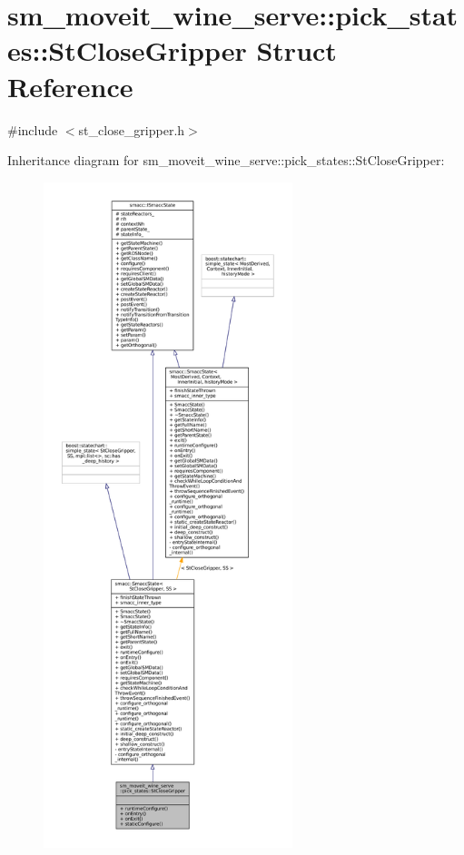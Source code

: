 \hypertarget{structsm__moveit__wine__serve_1_1pick__states_1_1StCloseGripper}{}\section{sm\+\_\+moveit\+\_\+wine\+\_\+serve\+:\+:pick\+\_\+states\+:\+:St\+Close\+Gripper Struct Reference}
\label{structsm__moveit__wine__serve_1_1pick__states_1_1StCloseGripper}


{\ttfamily \#include $<$st\+\_\+close\+\_\+gripper.\+h$>$}



Inheritance diagram for sm\+\_\+moveit\+\_\+wine\+\_\+serve\+:\+:pick\+\_\+states\+:\+:St\+Close\+Gripper\+:
\nopagebreak
\begin{figure}[H]
\begin{center}
\leavevmode
\includegraphics[height=550pt]{structsm__moveit__wine__serve_1_1pick__states_1_1StCloseGripper__inherit__graph}
\end{center}
\end{figure}


